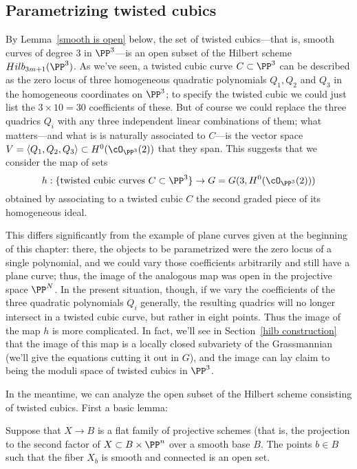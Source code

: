 \subsection{Parametrizing twisted cubics} By Lemma~\ref{smooth is open} below, the set of twisted cubics---that is, smooth curves of degree 3 in $\PP^3$---is an open subset of the Hilbert scheme $Hilb_{3m+1}(\PP^3)$. As we've seen, a twisted cubic curve $C \subset \PP^3$ can be described as the zero locus of three homogeneous quadratic polynomials $Q_1, Q_2$ and $Q_3$ in the homogeneous coordinates on $\PP^3$; to specify the twisted cubic we could just list the $3 \times 10 = 30$ coefficients of these. But of course we could replace the three quadrics $Q_i$ with any three independent linear combinations of them; what matters---and what is is naturally associated to $C$---is the vector space $V = \langle Q_1, Q_2, Q_3 \rangle \subset H^0(\cO_{\PP^3}(2))$ that they span. This suggests that we consider the map of sets
$$
h : \{ \text{twisted cubic curves } C \subset \PP^3 \} \to G = G(3, H^0(\cO_{\PP^3}(2)))
$$
obtained by associating to a twisted cubic $C$ the second graded piece of its homogeneous ideal. 

This differs significantly from the example of plane curves given at the beginning of this chapter: there, the objects to be parametrized were the zero locus of a single polynomial, and we could vary those coefficients arbitrarily and still have a plane curve; thus, the image of the analogous map was open in the projective space $\PP^N$. In the present situation, though, if we vary the coefficients of the three quadratic polynomials $Q_i$ generally, the resulting quadrics will no longer intersect in a twisted cubic curve, but rather in eight points. Thus the image of the map $h$ is more complicated.
In fact, we'll see in Section~\ref{hilb construction} that the image of this map is a locally closed subvariety of the Grassmannian (we'll give the equations cutting it out in $G$), and the image can lay claim to being the moduli space of twisted cubics in $\PP^3$.

In the meantime, we can analyze the open subset of the Hilbert scheme consisting of twisted cubics. First a basic lemma:

\begin{lemma}\label{smooth is open}
Suppose that $X \to B$ is a flat family of projective schemes (that is, the projection to the second factor of 
$X\subset B\times \PP^n$ over a smooth base $B$. The points $b\in B$ such that the fiber $X_b$ is smooth and connected is an open set.
\end{lemma}

